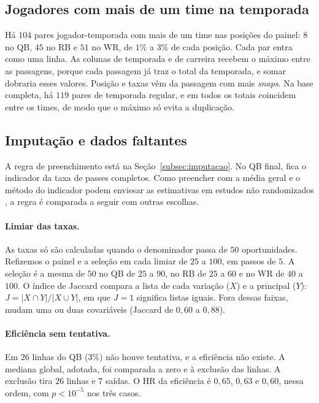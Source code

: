 \subsection{Jogadores com mais de um time na temporada}
\label{apx:multitime}

Há $104$ pares jogador-temporada com mais de um time nas posições do painel: $8$ no QB, $45$ no RB e $51$ no WR, de $1\%$ a $3\%$ de cada posição. Cada par entra como uma linha. As colunas de temporada e de carreira recebem o máximo entre as passagens, porque cada passagem já traz o total da temporada, e somar dobraria esses valores. Posição e taxas vêm da passagem com mais \textit{snaps}. Na base completa, há $119$ pares de temporada regular, e em todos os totais coincidem entre os times, de modo que o máximo só evita a duplicação.

\subsection{Imputação e dados faltantes}
\label{subsec:imputacao_apend}

A regra de preenchimento está na Seção~\ref{subsec:imputacao}. No QB final, fica o indicador da taxa de passes completos. Como preencher com a média geral e o método do indicador podem enviesar as estimativas em estudos não randomizados \citep{donders2006,groenwold2012}, a regra é comparada a seguir com outras escolhas.

\paragraph{Limiar das taxas.}\label{subsec:apend_limiar}
As taxas só são calculadas quando o denominador passa de $50$ oportunidades. Refizemos o painel e a seleção em cada limiar de $25$ a $100$, em passos de $5$. A seleção é a mesma de $50$ no QB de $25$ a $90$, no RB de $25$ a $60$ e no WR de $40$ a $100$. O índice de Jaccard compara a lista de cada variação ($X$) e a principal ($Y$): $J = |X\cap Y|/|X\cup Y|$, em que $J=1$ significa listas iguais. Fora dessas faixas, mudam uma ou duas covariáveis (Jaccard de $0{,}60$ a $0{,}88$).

\paragraph{Eficiência sem tentativa.}
Em $26$ linhas do QB ($3\%$) não houve tentativa, e a eficiência não existe. A mediana global, adotada, foi comparada a zero e à exclusão das linhas. A exclusão tira $26$ linhas e $7$ saídas. O HR da eficiência é $0{,}65$, $0{,}63$ e $0{,}60$, nessa ordem, com $p < 10^{-5}$ nos três casos.

